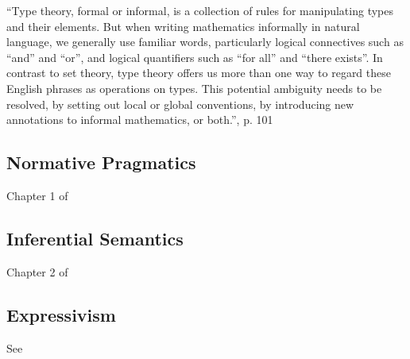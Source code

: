 ``Type theory, formal or informal, is a collection of rules for
manipulating types and their elements.  But when writing mathematics
informally in natural language, we generally use familiar words,
particularly logical connectives such as “and” and “or”, and logical
quantifiers such as “for all” and “there exists”. In contrast to set
theory, type theory offers us more than one way to regard these
English phrases as operations on types. This potential ambiguity needs
to be resolved, by setting out local or global conventions, by
introducing new annotations to informal mathematics, or both.''\HoTTB, p. 101

\subsection{Normative Pragmatics}
\label{subs:normprag}

  Chapter 1 of \cite{brandom_mie}

\subsection{Inferential Semantics}
\label{subs:inferentialism}

  Chapter 2 of \cite{brandom_mie}


\subsection{Expressivism}
\label{subs:expressivism}

See \cite{price_expressivism_2013}
